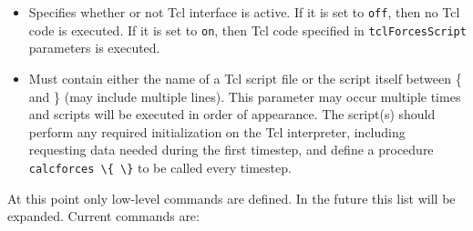 \begin{itemize}

\item
{}
{Specifies whether or not Tcl interface is active.  If it 
is set to \verb!off!, then no Tcl code is executed.  
If it is set to \verb!on!, then Tcl code specified in
\verb!tclForcesScript! parameters is executed.}

\item
{}
{Must contain either the name of a Tcl script file or the script 
itself between \{ and \} (may include multiple lines).
This parameter may occur multiple times and scripts will be executed
in order of appearance.
The script(s) should perform any required initialization on the Tcl interpreter, including requesting data needed during the first timestep, and define a procedure \verb!calcforces \{ \}! to be called every timestep.
}

\end{itemize}

At this point only low-level commands are defined.
In the future this list will be expanded.  Current commands are:


